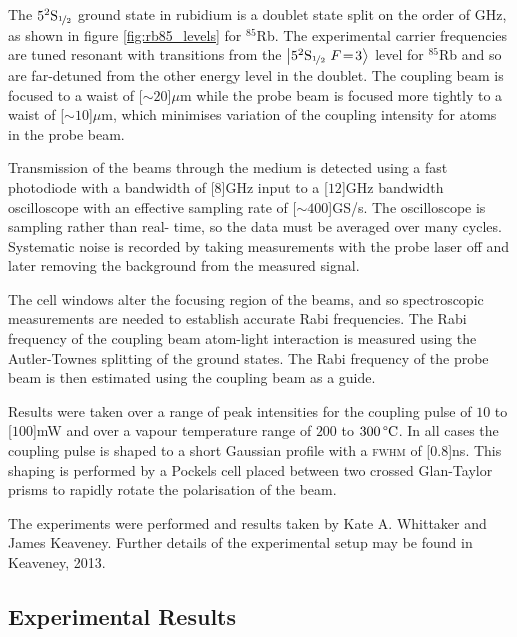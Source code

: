     The $5^2\mathrm{S}_{\nicefrac{1}{2}}$ ground state in rubidium is a doublet
    state split on the order of \unit{GHz}\cite{Arimondo1977}, as shown in
    figure \ref{fig:rb85_levels} for $^{85}$Rb. The experimental carrier
    frequencies are tuned resonant with transitions from the
    $\Ket{5^2\mathrm{S}_{\nicefrac{1}{2}}~F\!=\!3}$ level for $^{85}$Rb and so
    are far-detuned from the other energy level in the doublet. The coupling
    beam is focused to a waist of \unit[${\sim}20$]{$\mu$m} while the probe beam
    is focused more tightly to a waist of \unit[${\sim}10$]{$\mu$m}, which
    minimises variation of the coupling intensity for atoms in the probe
    beam.\cite{Keaveney2013}

    Transmission of the beams through the medium is detected using a fast
    photodiode with a bandwidth of \unit[$8$]{GHz} input to a \unit[$12$]{GHz}
    bandwidth oscilloscope with an effective sampling rate of
    \unit[${\sim}400$]{GS/s}. The oscilloscope is sampling rather than real-
    time, so the data must be averaged over many cycles. Systematic noise is
    recorded by taking measurements with the probe laser off and later removing
    the background from the measured signal.

    The cell windows alter the focusing region of the beams, and so
    spectroscopic measurements are needed to establish accurate Rabi
    frequencies. The Rabi frequency of the coupling beam atom-light interaction
    is measured using the Autler-Townes splitting of the ground states. The Rabi
    frequency of the probe beam is then estimated using the coupling beam as a
    guide.

    Results were taken over a range of peak intensities for the coupling pulse
    of $10$ to \unit[$100$]{mW} and over a vapour temperature range of $200$ to
    $\unit[300]{\textrm{\textdegree C}}$. In all cases the coupling pulse is
    shaped to a short Gaussian profile with a \textsc{fwhm} of \unit[$0.8$]{ns}.
    This shaping is performed by a Pockels cell placed between  two crossed
    Glan-Taylor prisms to rapidly rotate the polarisation of the  beam.

    The experiments were performed and results taken by Kate A. Whittaker and
    James Keaveney. Further details of the experimental setup may be found in
    Keaveney, 2013.\cite{Keaveney2013}

  \subsection{Experimental Results}

